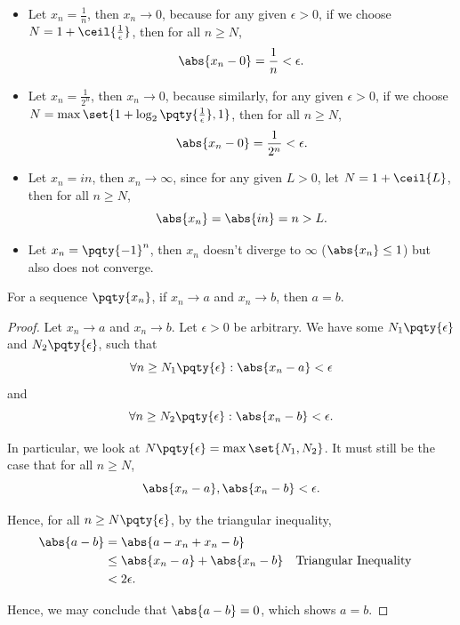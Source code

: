 \begin{examples}
    \label{ex:seq-limits}
    \begin{itemize}
        \item Let \(x_n = \frac{1}{n}\), then \(x_n \to 0\), because for any given \(\epsilon > 0\), if we choose \(N = 1 + \ceil{\frac{1}{\epsilon}}\), then for all \(n \geq N\),
        \[
            \abs{x_n - 0} = \frac{1}{n} < \epsilon.
        \]

        \item Let \(x_n = \frac{1}{2^n}\), then \(x_n \to 0\), because similarly, for any given \(\epsilon > 0\), if we choose \(N = \max\set{1 + \log_2 \pqty{\frac{1}{\epsilon}}, 1}\), then for all \(n \geq N\),
        \[
            \abs{x_n - 0} = \frac{1}{2^n} < \epsilon.
        \]

        \item Let \(x_n = in\), then \(x_n \to \infty\), since for any given \(L > 0\), let \(N = 1 + \ceil{L}\), then for all \(n \geq N\),
        \[
            \abs{x_n} = \abs{in} = n > L.
        \]

        \item Let \(x_n = \pqty{-1}^n\), then \(x_n\) doesn't diverge to \(\infty\) (\(\abs{x_n} \leq 1\)) but also does not converge.
    \end{itemize}
\end{examples}

\begin{lemma}
    \label{lem:seq-limit-unique}%
    For a sequence \(\pqty{x_n}\), if \(x_n \to a\) and \(x_n \to b\), then \(a = b\).
\end{lemma}

\begin{proof}
    Let \(x_n \to a\) and \(x_n \to b\). Let \(\epsilon > 0\) be arbitrary. We have some \(N_1 \pqty{\epsilon}\) and \(N_2 \pqty{\epsilon}\), such that
    \[
        \forall n \geq N_1\pqty{\epsilon}: \abs{x_n - a} < \epsilon
    \]
    and
    \[
        \forall n \geq N_2\pqty{\epsilon}: \abs{x_n - b} < \epsilon.
    \]

    In particular, we look at \(N\pqty{\epsilon} = \max\set{N_1, N_2}\). It must still be the case that for all \(n \geq N\),
    \[
        \abs{x_n - a}, \abs{x_n - b} < \epsilon.
    \]

    Hence, for all \(n \geq N\pqty{\epsilon}\), by the triangular inequality,
    \begin{align*}
        \abs{a - b} &= \abs{a - x_n + x_n - b} \\
        &\leq \abs{x_n - a} + \abs{x_n - b} && \text{Triangular Inequality} \\
        &< 2\epsilon.
    \end{align*}

    Hence, we may conclude that \(\abs{a - b} = 0\), which shows \(a = b\).
\end{proof}

